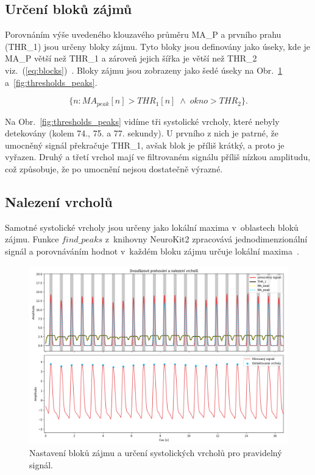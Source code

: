 \subsection*{Určení bloků zájmů}
\label{sec:blocks}
Porovnáním výše uvedeného klouzavého průměru \acs{MA_P} a prvního prahu (\acs{THR_1}) jsou určeny bloky zájmu.
Tyto bloky jsou definovány jako úseky, kde je \acs{MA_P} větší než \acs{THR_1} a zároveň jejich šířka je větší než \acs{THR_2} viz.~(\ref{eq:blocks})~\cite{Elgendi2013}.
Bloky zájmu jsou zobrazeny jako šedé úseky na Obr.~\ref{fig:thresholds_peaks_clean} a~\ref{fig:thresholds_peaks}.

\begin{equation}
	\{n : MA_{peak}[n] > THR_1[n] \; \land \; okno > THR_2\}.
	\label{eq:blocks}
\end{equation}

Na Obr.~\ref{fig:thresholds_peaks} vidíme tři systolické vrcholy, které nebyly detekovány (kolem 74., 75. a 77. sekundy).
U prvního z nich je patrné, že umocněný signál překračuje \acs{THR_1}, avšak blok je příliš krátký, a proto je vyřazen.
Druhý a třetí vrchol mají ve filtrovaném signálu příliš nízkou amplitudu, což způsobuje, že po umocnění nejsou dostatečně výrazné.

\subsection*{Nalezení vrcholů}
\label{sec:peaks}

Samotné systolické vrcholy jsou určeny jako lokální maxima v~oblastech bloků zájmu.
Funkce \(find\_peaks\) z~knihovny NeuroKit2 zpracovává jednodimenzionální signál a porovnáváním hodnot v~každém bloku zájmu určuje lokální maxima~\cite{NeuroKit2}.

\begin{figure}[t]
	\vspace{-9mm}
	\centering
	\includegraphics[width=1\textwidth]{./obrazky/Elgendi_THR_Peaks_Clean.png}
	\vspace{-10mm}
	\caption[Elgendiho zpracování pravidelného signálu]{Nastavení bloků zájmu a určení systolických vrcholů pro pravidelný signál.}
	\label{fig:thresholds_peaks_clean}
\end{figure}

